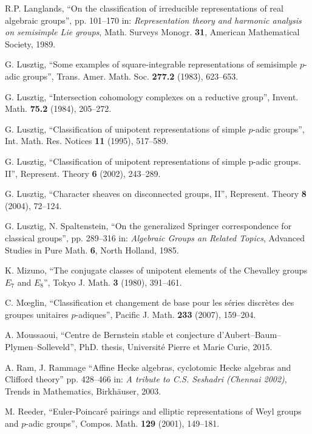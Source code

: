 \documentclass[11pt]{amsart}
\theoremstyle{definition}
\begin{document}
\begin{thebibliography}{99}
 R.P. Langlands,
``On the classification of irreducible representations of real algebraic groups'',
pp. 101--170 in: 
\emph{Representation theory and harmonic analysis on semisimple Lie groups},
Math. Surveys Monogr. {\bf 31}, American Mathematical Society, 1989.

 G. Lusztig, ``Some examples of square-integrable 
representations of semisimple $p$-adic groups'',
Trans. Amer. Math. Soc. {\bf 277.2} (1983), 623--653.

 G. Lusztig, 
``Intersection cohomology complexes on a reductive group'',
Invent. Math. {\bf 75.2} (1984), 205--272.

 G. Lusztig,
``Classification of unipotent representations of simple $p$-adic groups'',
Int. Math. Res. Notices {\bf 11} (1995), 517--589.

 G. Lusztig,
``Classification of unipotent representations of simple p-adic groups. II'',
Represent. Theory {\bf 6} (2002), 243--289. 

 G. Lusztig,
``Character sheaves on disconnected groups, II'', 
Represent. Theory {\bf 8} (2004), 72--124. 

 G. Lusztig, N. Spaltenstein, 
``On the generalized Springer correspondence for classical groups'',
pp. 289--316 in: \emph{Algebraic Groups an Related Topics},
Advanced Studies in Pure Math. {\bf 6}, North Holland, 1985.

 K. Mizuno,
``The conjugate classes of unipotent elements of the Chevalley groups 
$E_7$ and $E_8$'', Tokyo J. Math. {\bf 3} (1980), 391--461.

 C. M\oe glin,
``Classification et changement de base pour les s\'{e}ries discr\`{e}tes des
groupes unitaires $p$-adiques'', Pacific J. Math. {\bf 233} (2007), 159--204.

 A. Moussaoui,
``Centre de Bernstein stable et conjecture d'Aubert--Baum--Plymen--Solleveld'',
PhD. thesis, Universit\'e Pierre et Marie Curie, 2015.

 A. Ram, J. Rammage
``Affine Hecke algebras, cyclotomic Hecke algebras and Clifford theory''
pp. 428--466 in: \emph{A tribute to C.S. Seshadri (Chennai 2002)},
Trends in Mathematics, Birkh\"auser, 2003.

 M. Reeder, ``Euler-Poincar\'e pairings and elliptic 
representations of Weyl groups and $p$-adic groups'',
Compos. Math. {\bf 129} (2001), 149--181.


\end{thebibliography}
\end{document}
